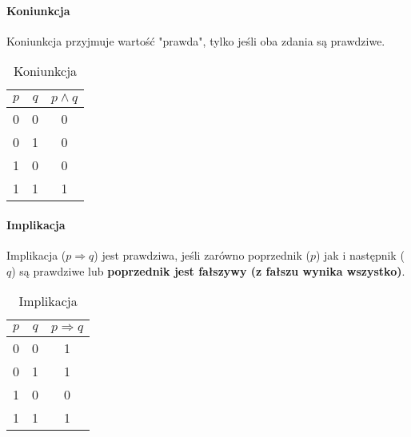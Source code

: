         \paragraph{Koniunkcja}
        Koniunkcja przyjmuje wartość "prawda", tylko jeśli oba zdania są prawdziwe.
        \begin{table}[h!]
            \begin{center}
                \caption{Koniunkcja}
                \label{tab:tabela3}
                \begin{tabular}{c|c|c}
                    \textbf{$p$} & \textbf{$q$} & \textbf{$p \wedge q$} \\
                    \midrule
                    0 & 0 & 0\\
                    0 & 1 & 0\\
                    1 & 0 & 0\\
                    1 & 1 & 1\\
                    \bottomrule
                \end{tabular}
            \end{center}
        \end{table}

        \paragraph{Implikacja}
        Implikacja ($p \Longrightarrow q$) jest prawdziwa, jeśli zarówno poprzednik ($p$) jak i następnik ($q$) są prawdziwe lub \textbf{poprzednik jest fałszywy (z fałszu wynika wszystko)}.
        \begin{table}[h!]
            \begin{center}
                \caption{Implikacja}
                \label{tab:tabela4}
                \begin{tabular}{c|c|c}
                    \textbf{$p$} & \textbf{$q$} & \textbf{$p \Longrightarrow q$} \\
                    \midrule
                    0 & 0 & 1\\
                    0 & 1 & 1\\
                    1 & 0 & 0\\
                    1 & 1 & 1\\
                    \bottomrule
                \end{tabular}
            \end{center}
        \end{table}
        
